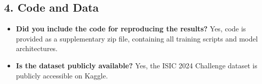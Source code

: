 \documentclass[letterpaper]{article} %
\begin{document}
\subsection*{4. Code and Data}
\begin{itemize}
    \item \textbf{Did you include the code for reproducing the results?} Yes, code is provided as a supplementary zip file, containing all training scripts and model architectures.
    \item \textbf{Is the dataset publicly available?} Yes, the ISIC 2024 Challenge dataset is publicly accessible on Kaggle.
\end{itemize}
\end{document}
